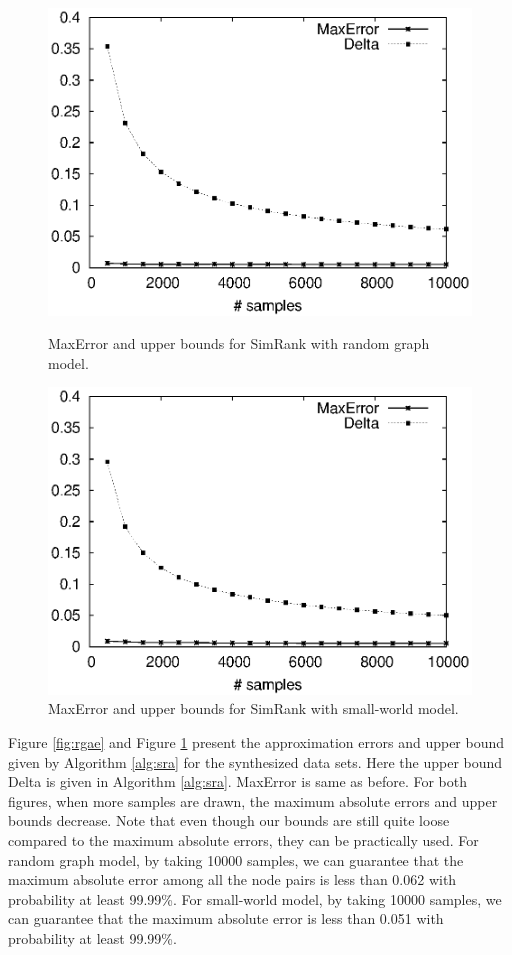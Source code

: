 \documentclass{article}
\begin{document}
\begin{figure}[!t]
\centering
\begin{minipage}{.45\textwidth}
\centering
\includegraphics[width=.9\textwidth]{simrank_rg_apprx_error.eps}
\caption{\textsf{MaxError} and upper bounds for SimRank with random graph model.}
\label{fig:rgae}
\end{minipage}
\hspace{1cm}
\begin{minipage}{.45\textwidth}
\centering
\includegraphics[width=.9\textwidth]{simrank_sw_apprx_error.eps}
\caption{\textsf{MaxError} and upper bounds for SimRank with small-world model.}
\label{fig:swae}
\end{minipage}
\end{figure}

Figure \ref{fig:rgae} and Figure \ref{fig:swae} present the approximation errors and upper bound given by Algorithm \ref{alg:sra} for the synthesized data sets.
Here the upper bound \textsf{Delta} is given in Algorithm \ref{alg:sra}. \textsf{MaxError} is same as before. 
For both figures, when more samples are drawn, the maximum absolute errors and upper bounds decrease. Note that even though our bounds are still quite loose compared to the maximum absolute errors, they can be practically used. For random graph model, by taking 10000 samples, we can guarantee that the maximum absolute error among all the node pairs is less than 0.062 with probability at least 99.99\%. For small-world model, by taking 10000 samples, we can guarantee that the maximum absolute error is less than 0.051 with probability at least 99.99\%.
\end{document}
